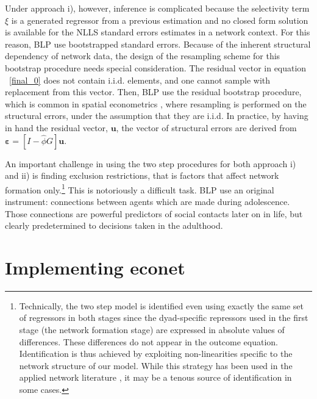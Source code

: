 \documentclass[nojss]{jss}
\begin{document}
	Under approach i), however, inference is complicated because the
	selectivity term $\xi$ is a generated regressor from a previous estimation and no closed form solution is available for the NLLS standard errors estimates in a network context. For this reason, BLP use bootstrapped standard errors. Because of the inherent structural dependency of network data, the design of the resampling scheme for this bootstrap procedure needs special consideration. The residual vector in equation ~\ref{final_0} does not contain i.i.d. elements, and one cannot sample with replacement from this vector. Then, BLP use the residual bootstrap procedure, which is common in spatial econometrics \citep[see][]{Anselin:1990}, where resampling is performed on the structural errors, under the assumption that they are i.i.d. In practice, by having in hand the residual vector, $\boldsymbol{u}$, the vector of structural errors are derived from $\mathbf{\varepsilon}=[I-\widehat{\phi}G]\boldsymbol{u}$.
	
	An important challenge in using the two step procedures for both approach i) and ii) is finding exclusion restrictions, that is factors that affect network formation only.\footnote{Technically, the two step model is identified even using exactly the same set of regressors in both stages since the dyad-specific repressors used in the first stage (the network formation stage) are expressed in absolute values of differences. These differences do not appear in the outcome equation. Identification is thus achieved by exploiting non-linearities specific to the network structure of our model. While this strategy has been used in the applied network literature \citep[see e.g.,][]{GPI:2013,CSL:2016}, it may be a tenous source of identification in some cases.} This is notoriously a difficult task. BLP use an original instrument: connections between agents which are made during adolescence. Those connections are powerful predictors of social contacts later on in life, but clearly predetermined to decisions taken in the adulthood.
	
	\section{Implementing econet}
	
\end{document}
